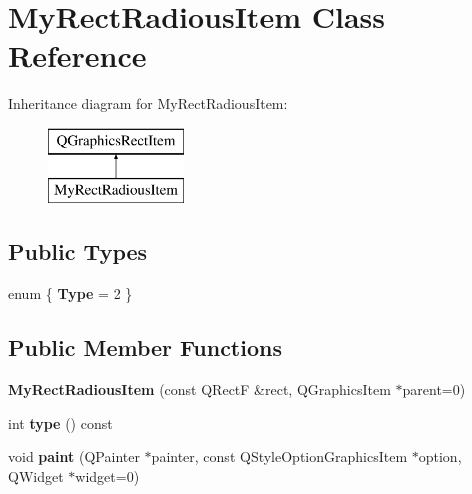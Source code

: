 \hypertarget{class_my_rect_radious_item}{}\section{My\+Rect\+Radious\+Item Class Reference}
\label{class_my_rect_radious_item}
Inheritance diagram for My\+Rect\+Radious\+Item\+:\begin{figure}[H]
\begin{center}
\leavevmode
\includegraphics[height=2.000000cm]{class_my_rect_radious_item}
\end{center}
\end{figure}
\subsection*{Public Types}
\begin{DoxyCompactItemize}
\item 
\hypertarget{class_my_rect_radious_item_afbf4ec490ddfd44216fdb7bb063449c1}{}enum \{ {\bfseries Type} = 2
 \}\label{class_my_rect_radious_item_afbf4ec490ddfd44216fdb7bb063449c1}

\end{DoxyCompactItemize}
\subsection*{Public Member Functions}
\begin{DoxyCompactItemize}
\item 
\hypertarget{class_my_rect_radious_item_ac967dc8ad5a9913a531e40ef62c97a17}{}{\bfseries My\+Rect\+Radious\+Item} (const Q\+Rect\+F \&rect, Q\+Graphics\+Item $\ast$parent=0)\label{class_my_rect_radious_item_ac967dc8ad5a9913a531e40ef62c97a17}

\item 
\hypertarget{class_my_rect_radious_item_a7a05b62d804aa0e8d8c4d71c74a2c0e1}{}int {\bfseries type} () const \label{class_my_rect_radious_item_a7a05b62d804aa0e8d8c4d71c74a2c0e1}

\item 
\hypertarget{class_my_rect_radious_item_a395db98794d9637fb4313b0dc1076bca}{}void {\bfseries paint} (Q\+Painter $\ast$painter, const Q\+Style\+Option\+Graphics\+Item $\ast$option, Q\+Widget $\ast$widget=0)\label{class_my_rect_radious_item_a395db98794d9637fb4313b0dc1076bca}

\end{DoxyCompactItemize}
